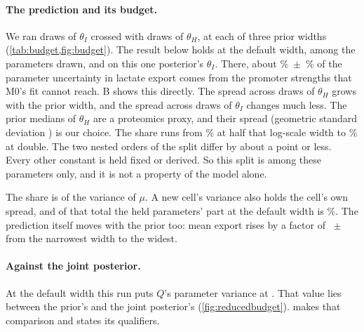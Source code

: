 \paragraph{The prediction and its budget.} We ran  draws of $\theta_I$
crossed with  draws of $\theta_H$, at each of three prior widths
(\cref{tab:budget,fig:budget}). The result below holds at the default width, among the
 parameters drawn, and on this one posterior's $\theta_I$. There,
about \%~$\pm$~\% of the parameter uncertainty
in lactate export comes from the  promoter strengths that M0's fit cannot
reach. B shows this directly. The spread across draws of $\theta_H$
grows with the prior width, and the spread across draws of $\theta_I$ changes much
less. The prior medians of $\theta_H$ are a proteomics proxy, and their spread (geometric
standard deviation ) is our choice. The share runs from
\% at half that log-scale width to \% at
double. The two nested orders of the split differ by about a point or less. Every other
constant is held fixed or derived. So this split is among these 
parameters only, and it is not a property of the model alone.

The share is of the variance of $\mu$. A new cell's variance also holds the cell's own
spread, and of that total the held parameters' part at the default width is
\%. The prediction itself moves with the prior too: mean export
rises by a factor of ~$\pm$~ from the
narrowest width to the widest.

\paragraph{Against the joint posterior.} At the default width this run puts $Q$'s
parameter variance at . That value lies between the prior's
 and the joint posterior's  (\cref{fig:reducedbudget}).
 makes that comparison and states its qualifiers.

